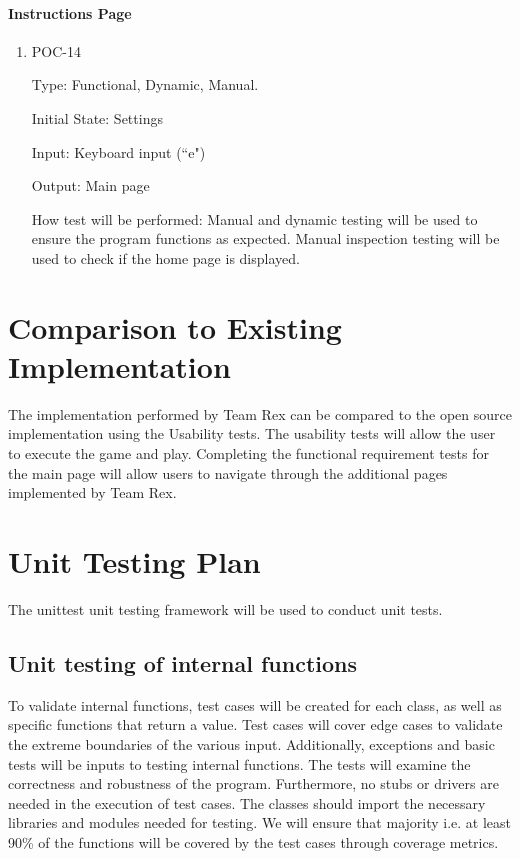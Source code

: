 \documentclass[12pt, titlepage]{article}
\begin{document}
\paragraph{Instructions Page}

\begin{enumerate}
					
\item{POC-14\\}

Type: Functional, Dynamic, Manual.
					
Initial State: Settings 
					
Input: Keyboard input (``e")
					
Output: Main page
					
How test will be performed: Manual and dynamic testing will be used to ensure the program functions as expected. Manual inspection testing will be used to check if the home page is displayed. 

\end{enumerate}
	
\section{Comparison to Existing Implementation}	
The implementation performed by Team Rex can be compared to the open source implementation using the Usability tests. The usability tests will allow the user to execute the game and play. Completing the functional requirement tests for the main page will allow users to navigate through the additional pages implemented by Team Rex. 

				
\section{Unit Testing Plan}

The unittest unit testing framework will be used to conduct unit tests.

\subsection{Unit testing of internal functions}
	
To validate internal functions, test cases will be created for each class, as well as specific functions that return a value. Test cases will cover edge cases to validate the extreme boundaries of the various input. Additionally, exceptions and basic tests will be inputs to testing internal functions. The tests will examine the correctness and robustness of the program.  Furthermore, no stubs or drivers are needed in the execution of test cases. The classes should import the necessary libraries and modules needed for testing. We will ensure that majority {i.e. at least 90\%} of the functions will be covered by the test cases through coverage metrics. 
\end{document}
